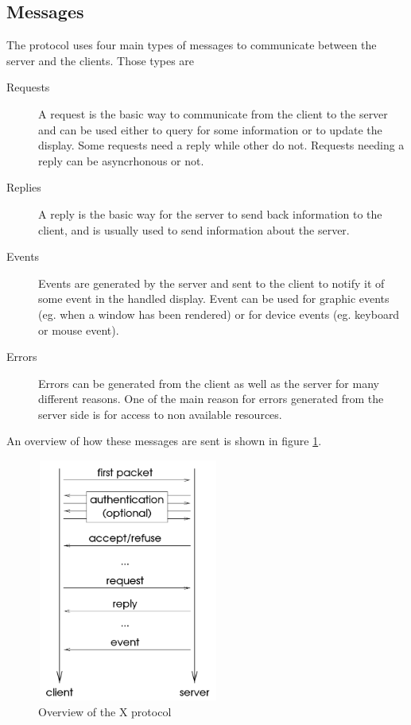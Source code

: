 \subsection{Messages}
The protocol uses four main types of messages to communicate between 
the server and the clients. Those types are
\begin{description}
\item[Requests] A request is the basic way to communicate from the client 
  to the server and can be used either to query for some information or to 
  update the display. Some requests need a reply while other do not. 
  Requests needing a reply can be asyncrhonous or not.
\item[Replies] A reply is the basic way for the server to send back
  information to the client, and is usually used to send information about the server.
\item[Events] Events are generated by the server and sent to the client to notify it of 
  some event in the handled display. Event can be used for graphic events 
  (eg. when a window has been rendered) or for device events (eg. keyboard or mouse event).
\item[Errors] Errors can be generated from the client as well as the server
  for many different reasons. One of the main reason for errors generated 
  from the server side is for access to non available resources.
\end{description}
An overview of how these messages are sent is shown in figure \ref{fig:xcore-overview}.
\begin{figure}[tb]
  \begin{center}
    \includegraphics[height=8cm,width=6cm]{../imgs/xcore-overview.png}
    \caption{\label{fig:xcore-overview}Overview of the X protocol}
  \end{center}
\end{figure}
